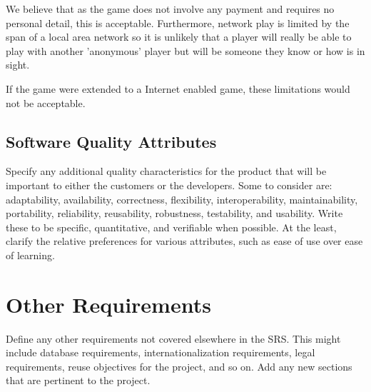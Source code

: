 \documentclass[a4paper,10pt]{article}
\begin{document}
We believe that as the game does not involve any payment and requires no personal detail, this is acceptable. Furthermore, network play is limited by the span of a local area network so it is unlikely that a player will really be able to play with another 'anonymous' player but will be someone they know or how is in sight.

If the game were extended to a Internet enabled game, these limitations would not be acceptable. 

\subsection{Software Quality Attributes}

Specify any additional quality characteristics for the product that will be important to either the customers or the developers. Some to consider are: adaptability, availability, correctness, flexibility, interoperability, maintainability, portability, reliability, reusability, robustness, testability, and usability. Write these to be specific, quantitative, and verifiable when possible. At the least, clarify the relative preferences for various attributes, such as ease of use over ease of learning.





\section{Other Requirements}
Define any other requirements not covered elsewhere in the SRS. This might include database requirements, internationalization requirements, legal requirements, reuse objectives for the project, and so on. Add any new sections that are pertinent to the project.
\end{document}
